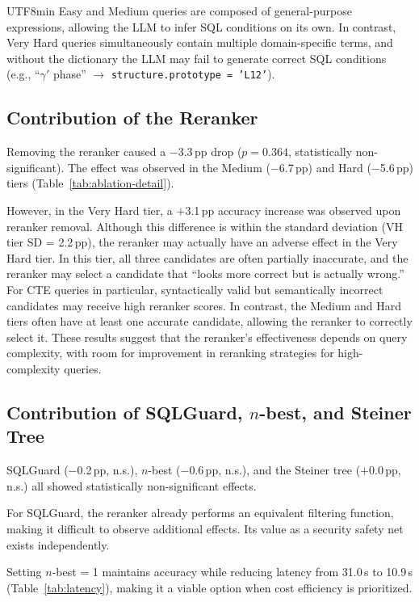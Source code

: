 \documentclass[sn-mathphys,Numbered]{sn-jnl}
\begin{document}
\begin{CJK}{UTF8}{min}
Easy and Medium queries are composed of general-purpose
expressions, allowing the LLM to infer SQL conditions on its own.
In contrast, Very Hard queries simultaneously contain multiple
domain-specific terms, and without the dictionary the LLM may
fail to generate correct SQL conditions (e.g.,
``$\gamma'$ phase'' $\to$
\texttt{structure.prototype = 'L12'}).

\subsection{Contribution of the Reranker}
\label{sec:reranker_discussion}

Removing the reranker caused a $-$3.3\,pp drop ($p=0.364$,
statistically non-significant).
The effect was observed in the Medium ($-$6.7\,pp) and Hard
($-$5.6\,pp) tiers (Table~\ref{tab:ablation-detail}).

However, in the Very Hard tier, a $+$3.1\,pp accuracy increase
was observed upon reranker removal.
Although this difference is within the standard deviation
(VH tier SD = 2.2\,pp), the reranker may actually have an
adverse effect in the Very Hard tier.
In this tier, all three candidates are often partially inaccurate,
and the reranker may select a candidate that ``looks more correct
but is actually wrong.''
For CTE queries in particular, syntactically valid but
semantically incorrect candidates may receive high reranker scores.
In contrast, the Medium and Hard tiers often have at least one
accurate candidate, allowing the reranker to correctly select it.
These results suggest that the reranker's effectiveness depends
on query complexity, with room for improvement in reranking
strategies for high-complexity queries.

\subsection{Contribution of SQLGuard, $n$-best, and Steiner Tree}

SQLGuard ($-$0.2\,pp, n.s.), $n$-best ($-$0.6\,pp, n.s.), and
the Steiner tree ($+$0.0\,pp, n.s.) all showed statistically
non-significant effects.

For SQLGuard, the reranker already performs an equivalent
filtering function, making it difficult to observe additional
effects. Its value as a security safety net exists independently.

Setting $n$-best = 1 maintains accuracy while reducing latency
from 31.0\,s to 10.9\,s (Table~\ref{tab:latency}), making it
a viable option when cost efficiency is prioritized.


\end{CJK}
\end{document}
